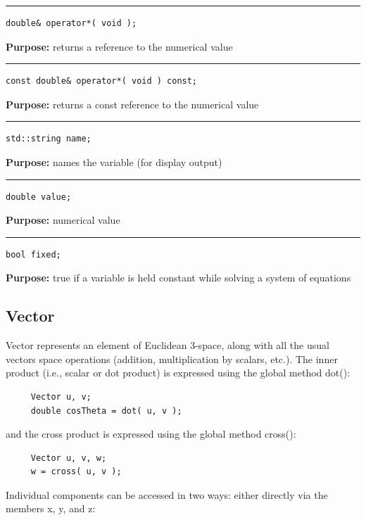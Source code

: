 \documentclass{article}
\begin{document}
\hspace{-.21in}\rule{5in}{1pt}
\begin{verbatim}
double& operator*( void );
\end{verbatim}
\textbf{Purpose:}
returns a reference to the numerical value

\hspace{-.21in}\rule{5in}{1pt}
\begin{verbatim}
const double& operator*( void ) const;
\end{verbatim}
\textbf{Purpose:}
returns a const reference to the numerical value

\hspace{-.21in}\rule{5in}{1pt}
\begin{verbatim}
std::string name;
\end{verbatim}
\textbf{Purpose:}
names the variable (for display output)

\hspace{-.21in}\rule{5in}{1pt}
\begin{verbatim}
double value;
\end{verbatim}
\textbf{Purpose:}
numerical value

\hspace{-.21in}\rule{5in}{1pt}
\begin{verbatim}
bool fixed;
\end{verbatim}
\textbf{Purpose:}
true if a variable is held constant while solving a system of equations
\pagebreak\subsection{Vector}

 

 Vector represents an element of Euclidean 3-space, along with all the usual vectors space operations (addition, multiplication by scalars, etc.).  The inner product (i.e., scalar or dot product) is expressed using the global method dot(): 

 \begin{verbatim}
     Vector u, v;
     double cosTheta = dot( u, v );
 \end{verbatim}
\vspace{-\baselineskip} and the cross product is expressed using the global method cross(): 

 \begin{verbatim}
     Vector u, v, w;
     w = cross( u, v );
 \end{verbatim}
\vspace{-\baselineskip} Individual components can be accessed in two ways: either directly via the members x, y, and z: 
\end{document}
